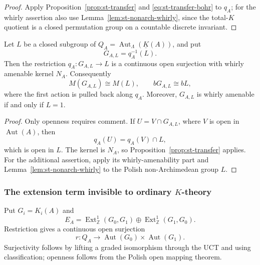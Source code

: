 \begin{proof}
Apply Proposition~\ref{prop:st-transfer} and \eqref{eq:st-transfer-bohr} to
$q_A$; for the whirly assertion also use Lemma~\ref{lem:st-nonarch-whirly},
since the total-$K$ quotient is a closed permutation group on a countable
discrete invariant.
\end{proof}

\begin{corollary}\label{cor:st-closed-preimages}
 Let $L$ be a closed subgroup of $Q_A=\operatorname{Aut} _\Lambda(\underline K(A))$, and put 
\begin{equation*}
G_{A,L}=q_A^{-1}(L). 
\end{equation*}
Then the restriction $q_A:G_{A,L}\to L$ is a continuous open surjection with
whirly amenable kernel $N_A$. Consequently
\begin{equation*}
M(G_{A,L})\cong M(L),\qquad bG_{A,L}\cong bL, 
\end{equation*}
where the first action is pulled back along $q_A$.
Moreover, $G_{A,L}$ is whirly amenable if and only if $L=1$.
\end{corollary}

\begin{proof}
Only openness requires comment. If $U=V\cap G_{A,L}$, where $V$ is open in $\operatorname{Aut}(A)$, then 
\begin{equation*}
q_A(U)=q_A(V)\cap L, 
\end{equation*}
which is open in $L$. The kernel is $N_A$, so Proposition~\ref{prop:st-transfer}
applies.
For the additional assertion, apply its whirly-amenability part and
Lemma~\ref{lem:st-nonarch-whirly} to the Polish non-Archimedean group $L$.
\end{proof}


\subsubsection{The extension term invisible to ordinary \(K\)-theory}

Put $G_i=K_i(A)$ and 
\begin{equation*}
E_A=\operatorname{Ext}^1_\mathbb{Z}(G_0,G_1)\oplus\operatorname{Ext}^1_\mathbb{Z}(G_1,G_0). 
\end{equation*}
Restriction gives a continuous open surjection 
\begin{equation*}
r:Q_A\longrightarrow\operatorname{Aut}(G_0)\times\operatorname{Aut}(G_1). 
\end{equation*}
Surjectivity follows by lifting a graded isomorphism through the UCT and
using classification; openness follows from the Polish open mapping theorem.

